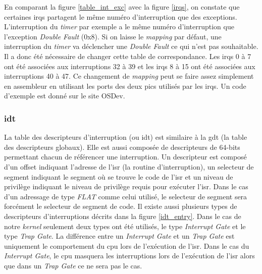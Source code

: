 En comparant la figure \ref{table_int_exc} avec la figure \ref{irqs}, on constate
que certaines \acrshort{irq}s partagent le même numéro d'interruption que des
exceptions. L'interruption du \textit{timer} par exemple a le même numéro d'interruption
que l'exception \textit{Double Fault} (0x8). Si on laisse le \textit{mapping} par
défaut, une interruption du \textit{timer} va déclencher une \textit{Double Fault}
ce qui n'est pas souhaitable. Il a donc été nécessaire de changer cette table
de correspondance. Les \acrshort{irq}s 0 à 7 ont été associées aux interruptions
32 à 39 et les \acrshort{irq}s 8 à 15 ont été associées aux interruptions 40 à 47.
Ce changement de \textit{mapping} peut se faire assez simplement en assembleur en
utilisant les ports des deux \acrshort{pic}s utilisés par les \acrshort{irq}s.
Un code d'exemple est donné sur le site OSDev.\cite{ref22}


\subsubsection{\acrshort{idt}}
La table des descripteurs d'interruption (ou \acrshort{idt}) est similaire à la
\acrshort{gdt} (la table des descripteurs globaux). Elle est aussi composée de
descripteurs de 64-bits permettant chacun de référencer une interruption. Un
descripteur est composé d'un offset indiquant l'adresse de l'\acrshort{isr} (la
routine d'interruption), un selecteur de segment indiquant le segment où se trouve
le code de l'\acrshort{isr} et un niveau de privilège indiquant le niveau de privilège
requis pour exécuter l'\acrshort{isr}. Dans le cas d'un adressage de type \textit{FLAT}
comme celui utilisé, le selecteur de segment sera forcément le selecteur de segment
de code. Il existe aussi plusieurs types de descripteurs d'interruptions\cite{ref66}
décrits dans la figure \ref{idt_entry}. Dans le cas de notre \textit{kernel} seulement
deux types ont été utilisés, le type \textit{Interrupt Gate} et le type \textit{Trap Gate}.
La différence entre un \textit{Interrupt Gate} et un \textit{Trap Gate} est uniquement
le comportement du \acrshort{cpu} lors de l'exécution de l'\acrshort{isr}\cite{ref42}.
Dans le cas du \textit{Interrupt Gate}, le \acrshort{cpu} masquera les interruptions
lors de l'exécution de l'\acrshort{isr} alors que dans un \textit{Trap Gate} ce
ne sera pas le cas. \\

